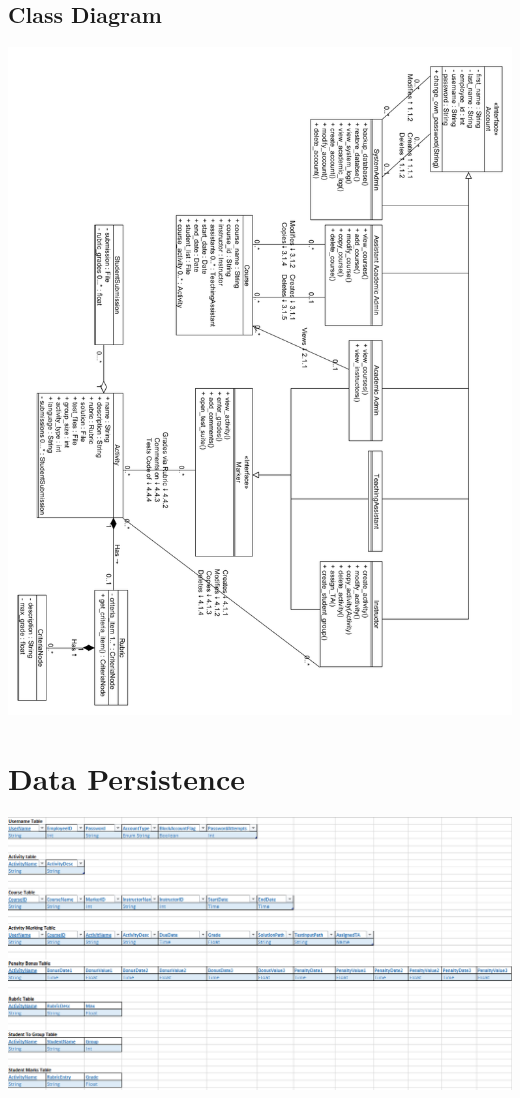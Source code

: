 \documentclass{article}
\begin{document}
\subsection{Class Diagram}
\centerline{\includegraphics[scale=0.5]{../images/Class_Diagram_Detailed}}

\section{Data Persistence}

\centerline{\includegraphics[scale=0.7]{../images/Data_Persistance.png}}
\end{document}
